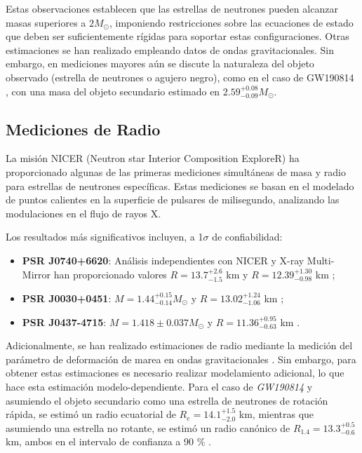 Estas observaciones establecen que las estrellas de neutrones pueden alcanzar masas superiores a $2 M_\odot$, imponiendo restricciones sobre las ecuaciones de estado que deben ser suficientemente rígidas para soportar estas configuraciones. Otras estimaciones se han realizado empleando datos de ondas gravitacionales. Sin embargo, en mediciones mayores aún se discute la naturaleza del objeto observado (estrella de neutrones o agujero negro), como en el caso de GW190814 \cite{theligoscientificcollaborationGW190814GravitationalWaves2020} \cite{lopesNatureMassgapObject2022}, con una masa del objeto secundario estimado en $2.59^{+0.08}_{-0.09} M_\odot$.

\subsection{Mediciones de Radio}

La misión NICER (Neutron star Interior Composition ExploreR) ha proporcionado algunas de las primeras mediciones simultáneas de masa y radio para estrellas de neutrones específicas. Estas mediciones se basan en el modelado de puntos calientes en la superficie de pulsares de milisegundo, analizando las modulaciones en el flujo de rayos X.

Los resultados más significativos incluyen, a 1$\sigma$ de confiabilidad:

\begin{itemize}
	\item \textbf{PSR J0740+6620}: Análisis independientes con NICER y X-ray Multi-Mirror han proporcionado valores $R = 13.7^{+2.6}_{-1.5}$ km \cite{millerRadiusPSRJ0740+66202021} y $R = 12.39^{+1.30}_{-0.98}$ km \cite{rileyNICERViewMassive2021};
	
	\item \textbf{PSR J0030+0451}: $M = 1.44^{+0.15}_{-0.14} M_\odot$ y $R = 13.02^{+1.24}_{-1.06}$ km \cite{millerPSRJ0030+0451Mass2019};
	
	\item \textbf{PSR J0437-4715}: $M = 1.418 \pm 0.037 M_\odot$ y $R = 11.36^{+0.95}_{-0.63}$ km \cite{choudhuryNICERViewNearest2024}.
\end{itemize}

Adicionalmente, se han realizado estimaciones de radio mediante la medición del parámetro de deformación de marea en ondas gravitacionales \cite{kumarTheoreticalExperimentalConstraints2024}. Sin embargo, para obtener estas estimaciones es necesario realizar modelamiento adicional, lo que hace esta estimación modelo-dependiente. Para el caso de \textit{GW190814} y asumiendo el objeto secundario como una estrella de neutrones de rotación rápida, se estimó un radio ecuatorial de $R_e = 14.1^{+1.5}_{-2.0}$ km, mientras que asumiendo una estrella no rotante, se estimó un radio canónico de $R_{1.4} = 13.3^{+0.5}_{-0.6}$ km, ambos en el intervalo de confianza a 90 \% \cite{biswasGW190814PropertiesSecondary2021}.\\


